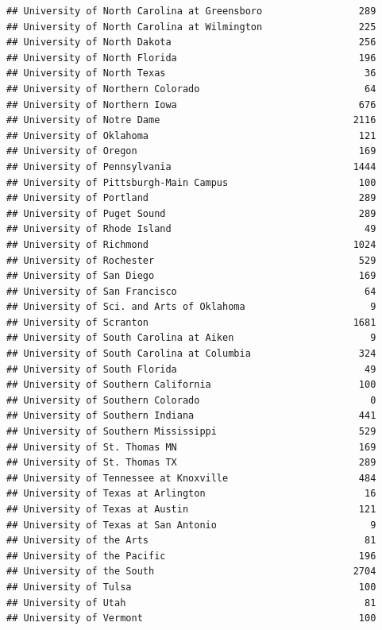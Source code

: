 \documentclass[
]{article}
\begin{document}
\begin{verbatim}
## University of North Carolina at Greensboro                 289
## University of North Carolina at Wilmington                 225
## University of North Dakota                                 256
## University of North Florida                                196
## University of North Texas                                   36
## University of Northern Colorado                             64
## University of Northern Iowa                                676
## University of Notre Dame                                  2116
## University of Oklahoma                                     121
## University of Oregon                                       169
## University of Pennsylvania                                1444
## University of Pittsburgh-Main Campus                       100
## University of Portland                                     289
## University of Puget Sound                                  289
## University of Rhode Island                                  49
## University of Richmond                                    1024
## University of Rochester                                    529
## University of San Diego                                    169
## University of San Francisco                                 64
## University of Sci. and Arts of Oklahoma                      9
## University of Scranton                                    1681
## University of South Carolina at Aiken                        9
## University of South Carolina at Columbia                   324
## University of South Florida                                 49
## University of Southern California                          100
## University of Southern Colorado                              0
## University of Southern Indiana                             441
## University of Southern Mississippi                         529
## University of St. Thomas MN                                169
## University of St. Thomas TX                                289
## University of Tennessee at Knoxville                       484
## University of Texas at Arlington                            16
## University of Texas at Austin                              121
## University of Texas at San Antonio                           9
## University of the Arts                                      81
## University of the Pacific                                  196
## University of the South                                   2704
## University of Tulsa                                        100
## University of Utah                                          81
## University of Vermont                                      100

\end{verbatim}
\end{document}
